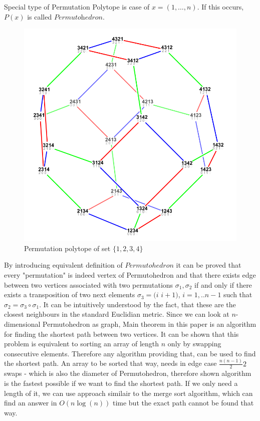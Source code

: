 \documentclass{article}
\theoremstyle{plain}
\theoremstyle{definition}
\begin{document}
Special type of Permutation Polytope is case of $x = (1, \dots, n)$. If this occurs, $P(x)$ is called $\textit{Permutohedron}$. \newline 
\begin{figure} 
    \caption{Permutation polytope of set $\{1,2,3,4\}$ 
                                                    }
    \centering
    \includegraphics[scale=0.3]{img/permutohedron4.png}
    \end{figure}
By introducing equivalent definition of $Permutohedron$ it can be proved that every "permutation" is indeed vertex of Permutohedron and that there exists edge between
two vertices associated with two permutations $\sigma_1, \sigma_2$ if and only if there exists a transposition of two next elements  $\sigma_3 = (i $ $ i+1)$, $i=1,..n-1$ such that  $ \sigma_2 = \sigma_3 \circ \sigma_1$.
\newline 
It can be intuitively understood by the fact, that these are the closest neighbours in the standard Euclidian metric. 
\newline
Since we can look at  $n$-dimensional Permutohedron as graph, Main theorem in this paper is an algorithm for finding the shortest path between two vertices. 
\newline
It can be shown that
this problem is equivalent to sorting an array of length $n$ only by swapping consecutive elements. Therefore any algorithm providing that, can be used to find the shortest path. 
\newline
An array to be sorted that way, needs in edge case $\frac{n(n-1)}{2}2$ swaps - which is also the diameter of Permutohedron, therefore shown algorithm is the fastest possible if we want 
to find the shortest path.
\newline
If we only need a length of it, we can use approach similair to the merge sort algorithm, which can find an answer in $O(n\log(n))$ time
but the exact path cannot be found that way. 
\end{document}
